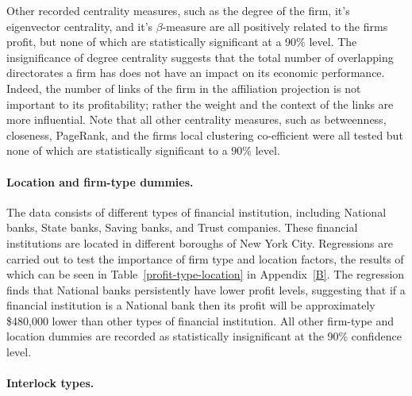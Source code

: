 Other recorded centrality measures, such as the degree of the firm, it's eigenvector centrality, and it's $\beta$-measure are all positively related to the firms profit, but none of which are statistically significant at a 90\% level. The insignificance of degree centrality suggests that the total number of overlapping directorates a firm has does not have an impact on its economic performance. Indeed, the number of links of the firm in the affiliation projection is not important to its profitability; rather the weight and the context of the links are more influential. Note that all other centrality measures, such as betweenness, closeness, PageRank, and the firms local clustering co-efficient were all tested but none of which are statistically significant to a 90\% level.

\paragraph{Location and firm-type dummies.}

The data consists of different types of financial institution, including National banks, State banks, Saving banks, and Trust companies. These financial institutions are located in different boroughs of New York City. Regressions are carried out to test the importance of firm type and location factors, the results of which can be seen in Table~\ref{profit-type-location} in Appendix~\ref{B}. The regression finds that National banks persistently have lower profit levels, suggesting that if a financial institution is a National bank then its profit will be approximately \$480,000 lower than other types of financial institution. All other firm-type and location dummies are recorded as statistically insignificant at the 90\% confidence level.

\paragraph{Interlock types.}

